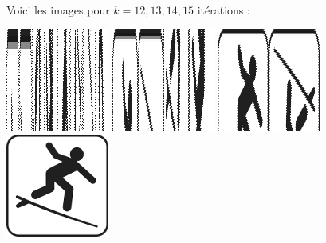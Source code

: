 \documentclass[12pt,class=report,crop=false]{standalone}
\begin{document}
Voici les images pour $k=12,13,14,15$ itérations :
\begin{center}
\includegraphics[scale=0.6]{images_fiche/surf_gimp_new_boul_12.png}\qquad
\includegraphics[scale=0.6]{images_fiche/surf_gimp_new_boul_13.png}\qquad
\includegraphics[scale=0.6]{images_fiche/surf_gimp_new_boul_14.png}\qquad
\includegraphics[scale=0.6]{images_fiche/surf_gimp_new_boul_15.png}
\end{center}
\end{document}

